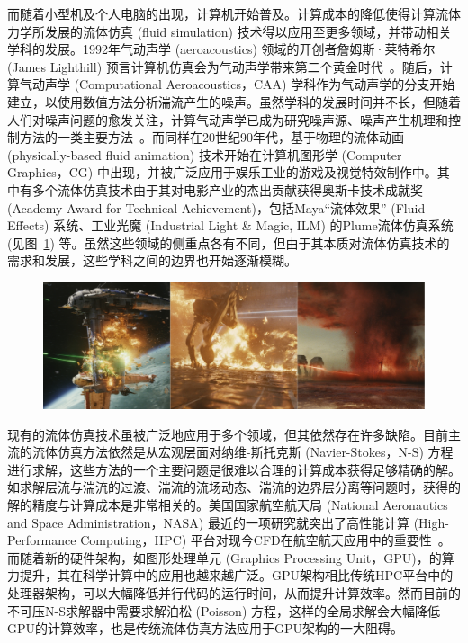而随着小型机及个人电脑的出现，计算机开始普及。计算成本的降低使得计算流体力学所发展的流体仿真 (fluid simulation) 技术得以应用至更多领域，并带动相关学科的发展。1992年气动声学 (aeroacoustics) 领域的开创者詹姆斯·莱特希尔 (James Lighthill) 预言计算机仿真会为气动声学带来第二个黄金时代~\cite{hardin1993computational}。随后，计算气动声学 (Computational Aeroacoustics，CAA) 学科作为气动声学的分支开始建立，以使用数值方法分析湍流产生的噪声。虽然学科的发展时间并不长，但随着人们对噪声问题的愈发关注，计算气动声学已成为研究噪声源、噪声产生机理和控制方法的一类主要方法~\cite{RN177}。而同样在20世纪90年代，基于物理的流体动画 (physically-based fluid animation) 技术开始在计算机图形学 (Computer Graphics，CG) 中出现，并被广泛应用于娱乐工业的游戏及视觉特效制作中。其中有多个流体仿真技术由于其对电影产业的杰出贡献获得奥斯卡技术成就奖 (Academy Award for Technical Achievement)，包括Maya“流体效果” (Fluid Effects) 系统、工业光魔 (Industrial Light \& Magic, ILM) 的Plume流体仿真系统 (见图~\ref{img:star_wars}) 等。虽然这些领域的侧重点各有不同，但由于其本质对流体仿真技术的需求和发展，这些学科之间的边界也开始逐渐模糊。

\begin{figure}[htbp]
  \centering
    \includegraphics[width=0.95\columnwidth]{figures/star_wars.png}
  \label{img:star_wars}
\end{figure}

现有的流体仿真技术虽被广泛地应用于多个领域，但其依然存在许多缺陷。目前主流的流体仿真方法依然是从宏观层面对纳维-斯托克斯 (Navier-Stokes，N-S) 方程进行求解，这些方法的一个主要问题是很难以合理的计算成本获得足够精确的解。如求解层流与湍流的过渡、湍流的流场动态、湍流的边界层分离等问题时，获得的解的精度与计算成本是非常相关的。美国国家航空航天局 (National Aeronautics and Space Administration，NASA) 最近的一项研究就突出了高性能计算 (High-Performance Computing，HPC) 平台对现今CFD在航空航天应用中的重要性~\cite{slotnick2014cfd}。而随着新的硬件架构，如图形处理单元 (Graphics Processing Unit，GPU)，的算力提升，其在科学计算中的应用也越来越广泛。GPU架构相比传统HPC平台中的处理器架构，可以大幅降低并行代码的运行时间，从而提升计算效率。然而目前的不可压N-S求解器中需要求解泊松 (Poisson) 方程，这样的全局求解会大幅降低GPU的计算效率，也是传统流体仿真方法应用于GPU架构的一大阻碍。

